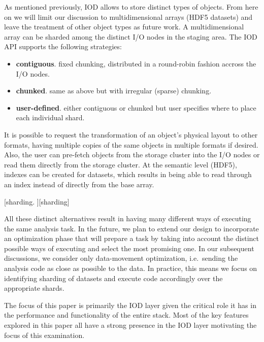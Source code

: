 \documentclass[conference]{IEEEtran}
\begin{document}
As mentioned previously, IOD allows to store distinct types of objects.
From here on we will limit our discussion to multidimensional arrays
(HDF5 datasets) and leave the treatment of other object types as future
work. A multidimensional array can be sharded among the distinct I/O
nodes in the staging area. The IOD API supports the following
strategies:

\begin{itemize}
\itemsep1pt\parskip0pt
\item
  \textbf{contiguous}. fixed chunking, distributed in a round-robin
  fashion accross the I/O nodes.
\item
  \textbf{chunked}. same as above but with irregular (sparse) chunking.
\item
  \textbf{user-defined}. either contiguous or chunked but user specifies
  where to place each individual shard.
\end{itemize}

It is possible to request the transformation of an object's physical
layout to other formats, having multiple copies of the same objects in
multiple formats if desired. Also, the user can pre-fetch objects from
the storage cluster into the I/O nodes or read them directly from the
storage cluster. At the semantic level (HDF5), indexes can be created
for datasets, which results in being able to read through an index
instead of directly from the base array.

{[}sharding. \label{sharding}{]}{[}sharding{]}

All these distinct alternatives result in having many different ways of
executing the same analysis task. In the future, we plan to extend our
design to incorporate an optimization phase that will prepare a task by
taking into account the distinct possible ways of executing and select
the most promising one. In our subsequent discussions, we consider only
data-movement optimization, i.e.~sending the analysis code as close as
possible to the data. In practice, this means we focus on identifying
sharding of datasets and execute code accordingly over the appropriate
shards.



The focus of this paper is primarily the IOD layer given the critical role it
has in the performance and functionality of the entire stack. Most of the key
features explored in this paper all have a strong presence in the IOD layer
motivating the focus of this examination.
\end{document}
